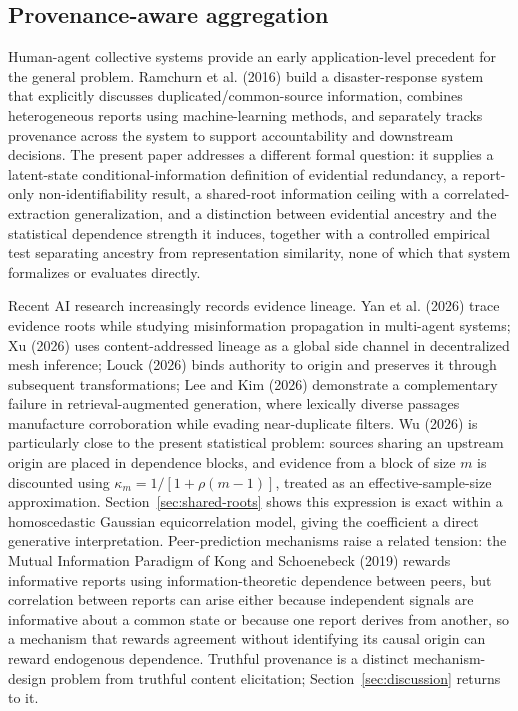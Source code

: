 \documentclass[11pt]{article}
\theoremstyle{definition}
\begin{document}
\subsection{Provenance-aware aggregation}

Human-agent collective systems provide an early application-level precedent for the general problem. Ramchurn et al. (2016) build a disaster-response system that explicitly discusses duplicated/common-source information, combines heterogeneous reports using machine-learning methods, and separately tracks provenance across the system to support accountability and downstream decisions. The present paper addresses a different formal question: it supplies a latent-state conditional-information definition of evidential redundancy, a report-only non-identifiability result, a shared-root information ceiling with a correlated-extraction generalization, and a distinction between evidential ancestry and the statistical dependence strength it induces, together with a controlled empirical test separating ancestry from representation similarity, none of which that system formalizes or evaluates directly.

Recent AI research increasingly records evidence lineage. Yan et al. (2026) trace evidence roots while studying misinformation propagation in multi-agent systems; Xu (2026) uses content-addressed lineage as a global side channel in decentralized mesh inference; Louck (2026) binds authority to origin and preserves it through subsequent transformations; Lee and Kim (2026) demonstrate a complementary failure in retrieval-augmented generation, where lexically diverse passages manufacture corroboration while evading near-duplicate filters. Wu (2026) is particularly close to the present statistical problem: sources sharing an upstream origin are placed in dependence blocks, and evidence from a block of size $m$ is discounted using $\kappa_m=1/[1+\rho(m-1)]$, treated as an effective-sample-size approximation. Section~\ref{sec:shared-roots} shows this expression is exact within a homoscedastic Gaussian equicorrelation model, giving the coefficient a direct generative interpretation. Peer-prediction mechanisms raise a related tension: the Mutual Information Paradigm of Kong and Schoenebeck (2019) rewards informative reports using information-theoretic dependence between peers, but correlation between reports can arise either because independent signals are informative about a common state or because one report derives from another, so a mechanism that rewards agreement without identifying its causal origin can reward endogenous dependence. Truthful provenance is a distinct mechanism-design problem from truthful content elicitation; Section~\ref{sec:discussion} returns to it.
\end{document}

